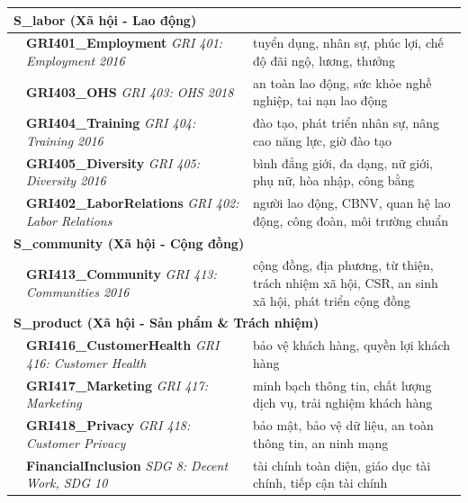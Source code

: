 \begin{longtable}{|p{2cm}|p{5cm}|p{7cm}|}
\multicolumn{3}{|l|}{\textbf{S\_labor (Xã hội - Lao động)}} \\
\hline
\multirow{1}{*}{} & \textbf{GRI401\_Employment} \newline \textit{GRI 401: Employment 2016} & tuyển dụng, nhân sự, phúc lợi, chế độ đãi ngộ, lương, thưởng \\
\hline
\multirow{1}{*}{} & \textbf{GRI403\_OHS} \newline \textit{GRI 403: OHS 2018} & an toàn lao động, sức khỏe nghề nghiệp, tai nạn lao động \\
\hline
\multirow{1}{*}{} & \textbf{GRI404\_Training} \newline \textit{GRI 404: Training 2016} & đào tạo, phát triển nhân sự, nâng cao năng lực, giờ đào tạo \\
\hline
\multirow{1}{*}{} & \textbf{GRI405\_Diversity} \newline \textit{GRI 405: Diversity 2016} & bình đẳng giới, đa dạng, nữ giới, phụ nữ, hòa nhập, công bằng \\
\hline
\multirow{1}{*}{} & \textbf{GRI402\_LaborRelations} \newline \textit{GRI 402: Labor Relations} & người lao động, CBNV, quan hệ lao động, công đoàn, môi trường chuẩn \\
\hline

\multicolumn{3}{|l|}{\textbf{S\_community (Xã hội - Cộng đồng)}} \\
\hline
\multirow{1}{*}{} & \textbf{GRI413\_Community} \newline \textit{GRI 413: Communities 2016} & cộng đồng, địa phương, từ thiện, trách nhiệm xã hội, CSR, an sinh xã hội, phát triển cộng đồng \\
\hline

\multicolumn{3}{|l|}{\textbf{S\_product (Xã hội - Sản phẩm \& Trách nhiệm)}} \\
\hline
\multirow{1}{*}{} & \textbf{GRI416\_CustomerHealth} \newline \textit{GRI 416: Customer Health} & bảo vệ khách hàng, quyền lợi khách hàng \\
\hline
\multirow{1}{*}{} & \textbf{GRI417\_Marketing} \newline \textit{GRI 417: Marketing} & minh bạch thông tin, chất lượng dịch vụ, trải nghiệm khách hàng \\
\hline
\multirow{1}{*}{} & \textbf{GRI418\_Privacy} \newline \textit{GRI 418: Customer Privacy} & bảo mật, bảo vệ dữ liệu, an toàn thông tin, an ninh mạng \\
\hline
\multirow{1}{*}{} & \textbf{FinancialInclusion} \newline \textit{SDG 8: Decent Work, SDG 10} & tài chính toàn diện, giáo dục tài chính, tiếp cận tài chính \\
\hline


\end{longtable}

